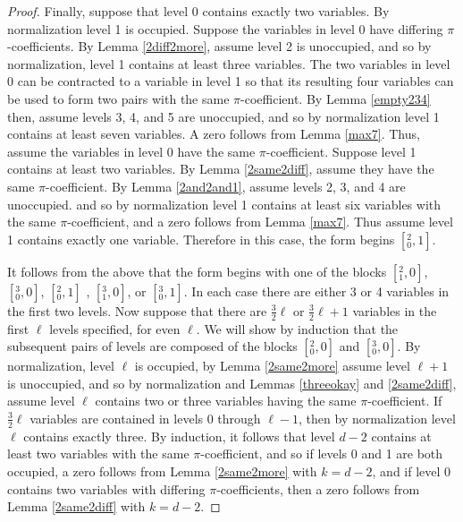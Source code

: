 \documentclass[12pt]{amsart}
\newtheorem{lemma}{Lemma}
\begin{document}
\begin{proof}

Finally, suppose that level 0 contains exactly two variables. By normalization level 1 is occupied.  Suppose the variables in level 0 have differing $\pi$-coefficients.  By Lemma \ref{2diff2more}, assume level 2 is unoccupied, and so by normalization, level 1 contains at least three variables.  The two variables in level 0 can be contracted to a variable in level 1 so that its resulting four variables can be used to form two pairs with the same $\pi$-coefficient.  By Lemma \ref{empty234} then, assume levels 3, 4, and 5 are unoccupied, and so by normalization level 1 contains at least seven variables.  A zero follows from Lemma \ref{max7}.  Thus, assume the variables in level 0 have the same $\pi$-coefficient.  Suppose level 1 contains at least two variables.  By Lemma \ref{2same2diff}, assume they have the same $\pi$-coefficient.  By Lemma \ref{2and2and1}, assume levels 2, 3, and 4 are unoccupied. and so by normalization level 1 contains at least six variables with the same $\pi$-coefficient, and a zero follows from Lemma \ref{max7}.  Thus assume level 1 contains exactly one variable.  Therefore in this case, the form begins $[{}^2_0,1]$.


It follows from the above that the form begins with one of the blocks $[{}^{2}_{1}, 0]$, $[{}^{3}_{0}, 0]$, $[{}^{2}_{0}, 1]$ , $[{}^{3}_{1},0]$, or $[{}^{3}_{0}, 1]$.  In each case there are either 3 or 4 variables in the first two levels. Now suppose that there are $\frac{3}{2}\ell$ or  $\frac{3}{2} \ell + 1$ variables in the first $\ell$ levels specified, for even $\ell$.  We will show by induction that the subsequent pairs of levels are composed of the blocks $[{}^2_0,0]$ and $[{}^3_0,0]$.  By normalization, level $\ell$ is occupied, by Lemma \ref{2same2more} assume level $\ell + 1$ is unoccupied, and so by normalization and Lemmas \ref{threeokay} and \ref{2same2diff}, assume level $\ell$ contains two or three variables having the same $\pi$-coefficient.  If $\frac{3}{2}\ell$ variables are contained in levels 0 through $\ell - 1$, then by normalization level $\ell$ contains exactly three.  By induction, it follows that level $d-2$ contains at least two variables with the same $\pi$-coefficient, and so if levels 0 and 1 are both occupied, a zero follows from Lemma \ref{2same2more} with $k=d-2$, and if level 0 contains two variables with differing $\pi$-coefficients, then a zero follows from Lemma \ref{2same2diff} with $k=d-2$.


\end{proof}
\end{document}
